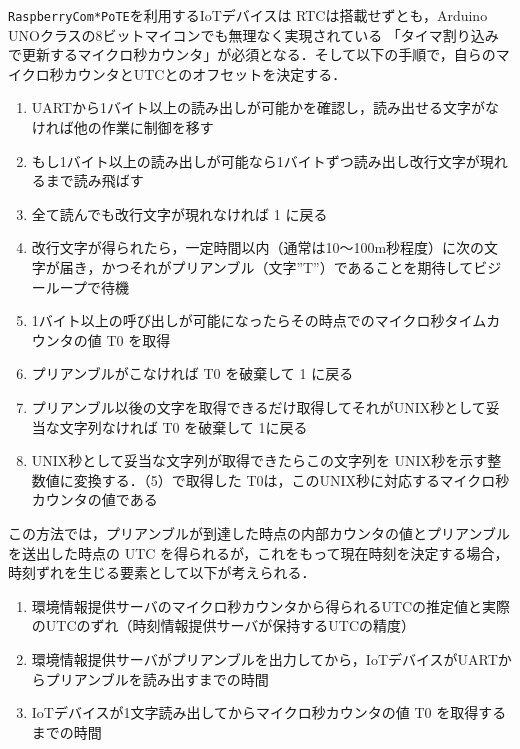 
{} \par


{\tt Raspberry\-Com*PoTE}を利用するIoTデバイスは RTCは搭載せずとも，Arduino UNOクラスの8ビットマイコンでも無理なく実現されている
「タイマ割り込みで更新するマイクロ秒カウンタ」が必須となる．そして以下の手順で，自らのマイクロ秒カウンタとUTCとのオフセットを決定する．

\begin{enumerate}
\item UARTから1バイト以上の読み出しが可能かを確認し，読み出せる文字がなければ他の作業に制御を移す
\item もし1バイト以上の読み出しが可能なら1バイトずつ読み出し改行文字が現れるまで読み飛ばす
\item 全て読んでも改行文字が現れなければ 1 に戻る
\item 改行文字が得られたら，一定時間以内（通常は10〜100m秒程度）に次の文字が届き，かつそれがプリアンブル（文字''T''）であることを期待してビジーループで待機
\item 1バイト以上の呼び出しが可能になったらその時点でのマイクロ秒タイムカウンタの値 T0 を取得
\item プリアンブルがこなければ T0 を破棄して 1 に戻る
\item プリアンブル以後の文字を取得できるだけ取得してそれがUNIX秒として妥当な文字列なければ T0 を破棄して 1に戻る
\item UNIX秒として妥当な文字列が取得できたらこの文字列を UNIX秒を示す整数値に変換する．（5）で取得した T0は，このUNIX秒に対応するマイクロ秒カウンタの値である
\end{enumerate}

この方法では，プリアンブルが到達した時点の内部カウンタの値とプリアンブルを送出した時点の UTC を得られるが，これをもって現在時刻を決定する場合，時刻ずれを生じる要素として以下が考えられる．

\begin{enumerate}
\item 環境情報提供サーバのマイクロ秒カウンタから得られるUTCの推定値と実際のUTCのずれ（時刻情報提供サーバが保持するUTCの精度）
\item 環境情報提供サーバがプリアンブルを出力してから，IoTデバイスがUARTからプリアンブルを読み出すまでの時間
\item IoTデバイスが1文字読み出してからマイクロ秒カウンタの値 T0 を取得するまでの時間
\end{enumerate}

